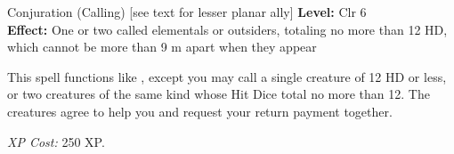 {Conjuration (Calling) [see text for lesser planar ally]}
{
	\textbf{Level:}
	Clr 6\\
	\textbf{Effect:}
	One or two called elementals or outsiders, totaling no more than 12 HD, which cannot be more than 9 m apart when they appear\\
}
{
	This spell functions like , except you may call a single creature of 12 HD or less, or two creatures of the same kind whose Hit Dice total no more than 12. The creatures agree to help you and request your return payment together.

	\textit{XP Cost:}
	250 XP.

}
